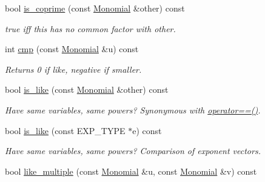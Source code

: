 \begin{Indent}
\begin{DoxyCompactItemize}
\mbox{\label{group__polygroup_afa3c3085358be86a5f593d7259f80000}} 
bool \hyperlink{group__polygroup_afa3c3085358be86a5f593d7259f80000}{is\+\_\+coprime} (const \hyperlink{group__polygroup_class_monomial}{Monomial} \&other) const
\begin{DoxyCompactList}\small\item\em {\ttfamily true} iff {\ttfamily this} has no common factor with {\ttfamily other}. \end{DoxyCompactList}\item 
\mbox{\label{group__polygroup_adf3fd71374a0058b653edd441b8dfb5d}} 
int \hyperlink{group__polygroup_adf3fd71374a0058b653edd441b8dfb5d}{cmp} (const \hyperlink{group__polygroup_class_monomial}{Monomial} \&u) const
\begin{DoxyCompactList}\small\item\em Returns 0 if like, negative if smaller. \end{DoxyCompactList}\item 
\mbox{\label{group__polygroup_a563c96b359a1faa97d73be48576c1d42}} 
bool \hyperlink{group__polygroup_a563c96b359a1faa97d73be48576c1d42}{is\+\_\+like} (const \hyperlink{group__polygroup_class_monomial}{Monomial} \&other) const
\begin{DoxyCompactList}\small\item\em Have same variables, same powers? Synonymous with \hyperlink{group__polygroup_a063e7166a4bf8abc8748f8758cc31d73}{operator==()}. \end{DoxyCompactList}\item 
\mbox{\label{group__polygroup_ac68d2650242d00ab6c26c3f01f31414a}} 
bool \hyperlink{group__polygroup_ac68d2650242d00ab6c26c3f01f31414a}{is\+\_\+like} (const E\+X\+P\+\_\+\+T\+Y\+PE $\ast$e) const
\begin{DoxyCompactList}\small\item\em Have same variables, same powers? Comparison of exponent vectors. \end{DoxyCompactList}\item 
\mbox{\label{group__polygroup_adec4a37e9e36f821ae69ca00eb087961}} 
bool \hyperlink{group__polygroup_adec4a37e9e36f821ae69ca00eb087961}{like\+\_\+multiple} (const \hyperlink{group__polygroup_class_monomial}{Monomial} \&u, const \hyperlink{group__polygroup_class_monomial}{Monomial} \&v) const

\end{DoxyCompactItemize}
\end{Indent}
